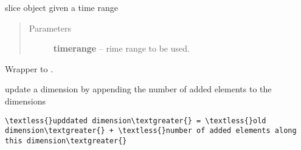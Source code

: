\documentclass[letterpaper,10pt,english]{sphinxmanual}
\begin{document}
\begin{fulllineitems}
\begin{fulllineitems}
\begin{quote}
\begin{description}
\end{description}\end{quote}

\end{fulllineitems}


\begin{fulllineitems}
\label{altimetry.data:altimetry.data.hydro_data.time_slice}
slice object given a time range
\begin{quote}\begin{description}
\item[{Parameters}] \leavevmode
\textbf{timerange} -- rime range to be used.

\end{description}\end{quote}

\end{fulllineitems}


\begin{fulllineitems}
\label{altimetry.data:altimetry.data.hydro_data.update}
Wrapper to {\hyperref[altimetry.data:altimetry.data.hydro_data.update_with_slice]{}}.

\end{fulllineitems}


\begin{fulllineitems}
\label{altimetry.data:altimetry.data.hydro_data.update_Dim}
update a dimension by appending the number of added elements to the dimensions

\begin{Verbatim}[commandchars=\\\{\}]
\textless{}upddated dimension\textgreater{} = \textless{}old dimension\textgreater{} + \textless{}number of added elements along this dimension\textgreater{}
\end{Verbatim}

\end{fulllineitems}


\end{fulllineitems}
\end{document}
